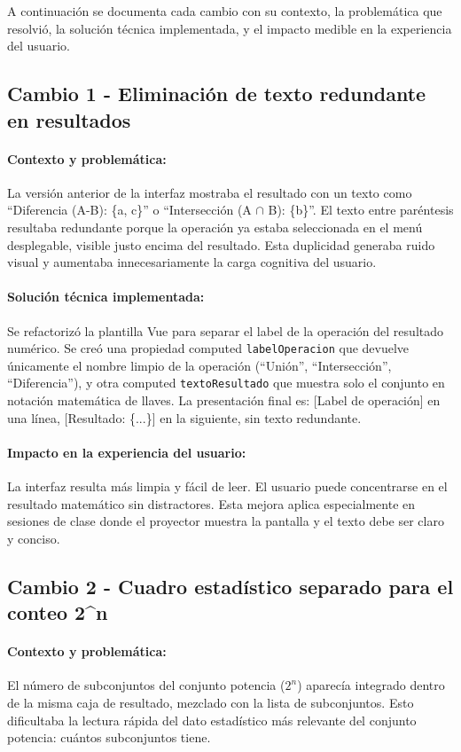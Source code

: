 \documentclass[11pt,a4paper]{article}
\begin{document}
A continuación se documenta cada cambio con su contexto, la problemática que resolvió, la solución técnica implementada, y el impacto medible en la experiencia del usuario.

\subsection{Cambio 1 - Eliminación de texto redundante en resultados}
\paragraph{Contexto y problemática:}
La versión anterior de la interfaz mostraba el resultado con un texto como ``Diferencia (A-B): \{a, c\}'' o ``Intersección (A $\cap$ B): \{b\}''. El texto entre paréntesis resultaba redundante porque la operación ya estaba seleccionada en el menú desplegable, visible justo encima del resultado. Esta duplicidad generaba ruido visual y aumentaba innecesariamente la carga cognitiva del usuario.

\paragraph{Solución técnica implementada:}
Se refactorizó la plantilla Vue para separar el label de la operación del resultado numérico. Se creó una propiedad computed \texttt{labelOperacion} que devuelve únicamente el nombre limpio de la operación (``Unión'', ``Intersección'', ``Diferencia''), y otra computed \texttt{textoResultado} que muestra solo el conjunto en notación matemática de llaves. La presentación final es: [Label de operación] en una línea, [Resultado: \{...\}] en la siguiente, sin texto redundante.

\paragraph{Impacto en la experiencia del usuario:}
La interfaz resulta más limpia y fácil de leer. El usuario puede concentrarse en el resultado matemático sin distractores. Esta mejora aplica especialmente en sesiones de clase donde el proyector muestra la pantalla y el texto debe ser claro y conciso.

\subsection{Cambio 2 - Cuadro estadístico separado para el conteo 2\textasciicircum n}
\paragraph{Contexto y problemática:}
El número de subconjuntos del conjunto potencia ($2^n$) aparecía integrado dentro de la misma caja de resultado, mezclado con la lista de subconjuntos. Esto dificultaba la lectura rápida del dato estadístico más relevante del conjunto potencia: cuántos subconjuntos tiene.
\end{document}

